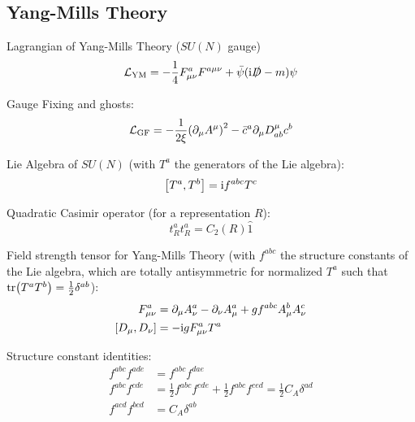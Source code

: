 	\subsection{Yang-Mills Theory}
		Lagrangian of Yang-Mills Theory ($SU(N)$ gauge)
		\begin{equation}
			\mathcal{L}_\text{YM} = -\frac{1}{4} F^a_{\mu\nu} F^{a\mu\nu} + \bar{\psi}(\mathrm{i}\slashed{D}-m)\psi
		\end{equation}

		\noindent
		Gauge Fixing and ghosts:
		\begin{equation}
			\mathcal{L}_\text{GF} = -\frac{1}{2\xi} \qty(\partial_\mu A^\mu)^2 - \bar{c}^a \partial_\mu D^\mu_{ab} c^b
		\end{equation}

		\noindent
		Lie Algebra of $SU(N)$ (with $T^a$ the generators of the Lie algebra):
		\begin{equation}
			\comm{T^a}{T^b} = \i f^{abc} T^c
		\end{equation}

		\noindent
		Quadratic Casimir operator (for a representation $R$):
		\begin{equation}
			t^a_R t^a_R = C_2(R) \hat{1}
		\end{equation}

		\noindent
		Field strength tensor for Yang-Mills Theory (with $f^{abc}$ the structure constants of the Lie algebra, which are totally antisymmetric for normalized $T^a$ such that $\tr(T^a T^b) = \frac{1}{2} \delta^{ab}$):
		\begin{equation}
			\begin{aligned}
				F^a_{\mu\nu} &= \partial_\mu A^a_\nu - \partial_\nu A^a_\mu + g f^{abc} A^b_\mu A^c_\nu \\
				\comm{D_\mu}{D_\nu} &= -\i g F_{\mu\nu}^a T^a				
			\end{aligned}
		\end{equation}

		\noindent
		Structure constant identities:
		\begin{equation}
			\begin{aligned}
				f^{abc} f^{ade} &= f^{abc} f^{dae} \\
				f^{abc} f^{cde} &= \frac{1}{2} f^{abc} f^{cde} + \frac{1}{2} f^{abc} f^{ced} = \frac{1}{2} C_A \delta^{ad} \\
				f^{acd} f^{bcd} &= C_A \delta^{ab}
			\end{aligned}
		\end{equation}

